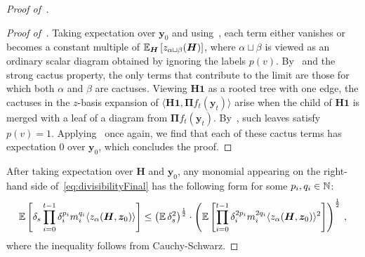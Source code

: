 \begin{proof}[Proof of~]
\begin{proof}[Proof of~]
        Taking expectation over $\bm y_0$ and using~, each term either vanishes or becomes a constant multiple of $\operatorname*{\mathbb{E}}_{\bm H} \left[z_{\alpha\sqcup \beta} (\bm H)\right]$, where $\alpha\sqcup\beta$ is viewed as an ordinary scalar diagram obtained by ignoring the labels $p(v)$. By~ and the strong cactus property, the only terms that contribute to the limit are those for which both $\alpha$ and $\beta$ are cactuses.
        Viewing $\bm H\bm 1$ as a rooted tree with one edge, the cactuses in the $z$-basis expansion of $\langle \bm H \bm 1, \bm \Pi f_t(\bm y_t)\rangle$ arise when the child of $\bm H\bm 1$ is merged with a leaf of a diagram from $\bm \Pi f_t(\bm y_t)$. By~, such leaves satisfy $p(v)=1$. Applying~ once again, we find that each of these cactus terms has expectation $0$ over $\bm y_0$, which concludes the proof.
    \end{proof}

    After taking expectation over $\bm H$ and $\bm y_0$, any monomial appearing on the right-hand side of~\cref{eq:divisibilityFinal} has the following form for some $p_i,q_i\in \mathbb{N}$:
    \begin{equation}
        \operatorname*{\mathbb{E}} \left[\delta_s \prod_{i=0}^{t-1} \delta_i^{p_i} m_i^{q_i} \langle z_{\alpha}(\bm H, \bm z_0)\rangle\right] \le \left(\operatorname*{\mathbb{E}} \delta_s^2\right)^{\frac 12} \cdot \left(\operatorname*{\mathbb{E}} \left[\prod_{i=0}^{t-1} \delta_i^{2p_i} m_i^{2q_i} \langle z_{\alpha}(\bm H, \bm z_0)\rangle^2\right]\right)^{\frac 12}\,,\label{eq:anyTerm}
    \end{equation}
    where the inequality follows from Cauchy-Schwarz.
    

\end{proof}
